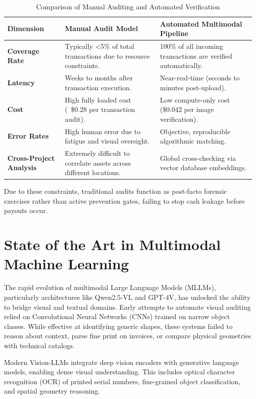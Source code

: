 \documentclass[11pt,letterpaper]{report}
\newcommand{\tableheader}[1]{\textbf{\color{white}#1}}
\begin{document}
\begin{table}[htbp]
\centering
\caption{Comparison of Manual Auditing and Automated Verification}
\label{tab:audit_limitations}
\small
\begin{tabular}{@{}lp{6cm}p{6cm}@{}}
\toprule
\tableheader{Dimension} & \tableheader{Manual Audit Model} & \tableheader{Automated Multimodal Pipeline} \\
\midrule
\textbf{Coverage Rate} & Typically <5\% of total transactions due to resource constraints. & 100\% of all incoming transactions are verified automatically. \\
\textbf{Latency} & Weeks to months after transaction execution. & Near-real-time (seconds to minutes post-upload). \\
\textbf{Cost} & High fully loaded cost (~\$0.28 per transaction audit). & Low compute-only cost (\$0.042 per image verification). \\
\textbf{Error Rates} & High human error due to fatigue and visual oversight. & Objective, reproducible algorithmic matching. \\
\textbf{Cross-Project Analysis} & Extremely difficult to correlate assets across different locations. & Global cross-checking via vector database embeddings. \\
\bottomrule
\end{tabular}
\end{table}

Due to these constraints, traditional audits function as post-facto forensic exercises rather than active prevention gates, failing to stop cash leakage before payouts occur.

\section{State of the Art in Multimodal Machine Learning}

The rapid evolution of multimodal Large Language Models (MLLMs), particularly architectures like Qwen2.5-VL and GPT-4V, has unlocked the ability to bridge visual and textual domains. Early attempts to automate visual auditing relied on Convolutional Neural Networks (CNNs) trained on narrow object classes. While effective at identifying generic shapes, these systems failed to reason about context, parse fine print on invoices, or compare physical geometries with technical catalogs.

Modern Vision-LLMs integrate deep vision encoders with generative language models, enabling dense visual understanding. This includes optical character recognition (OCR) of printed serial numbers, fine-grained object classification, and spatial geometry reasoning. 
\end{document}
